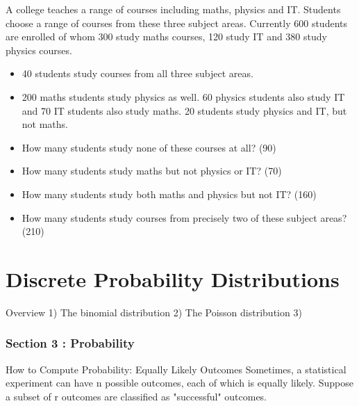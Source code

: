 \documentclass[12pt]{report}
\begin{document}
{{%


A college teaches a range of courses including maths, physics and IT.
Students choose a range of courses from these three subject areas. Currently 600
students are enrolled of whom 300 study maths courses, 120 study IT
and 380 study physics courses. 

\begin{itemize}
	\item 40 students study courses from all three subject
	areas. 
	\item 200 maths students study physics as well. 60 physics students
	also study IT and 70 IT students also study maths. 20 students study physics and IT, but not maths.
\end{itemize}



\begin{itemize}
	\item How many students study none of these courses at all? (90)
	
	\item How many students study maths but not physics or IT? (70)
	
	\item How many students study both maths and physics but not IT? (160)
	
	\item How many students study courses from precisely two of these subject
	areas? (210)
\end{itemize}


 		\chapter{Discrete Probability Distributions}
Overview
1) The binomial distribution
2) The Poisson distribution
3) 



\subsection*{Section 3 : Probability}

How to Compute Probability: Equally Likely Outcomes
Sometimes, a statistical experiment can have n possible outcomes, each of which is equally likely. Suppose a subset of r outcomes are classified as "successful" outcomes.

}}
\end{document}
